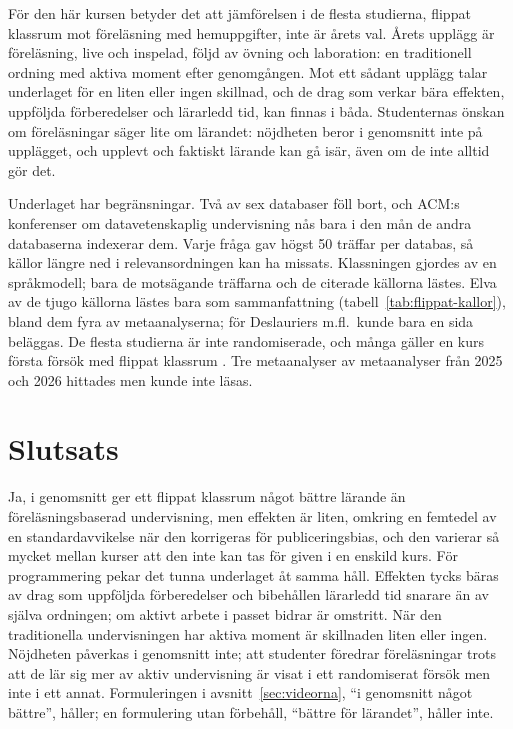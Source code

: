 För den här kursen betyder det att jämförelsen i de flesta studierna,
flippat klassrum mot föreläsning med hemuppgifter, inte är årets val.
Årets upplägg är föreläsning, live och inspelad, följd av övning och
laboration: en traditionell ordning med aktiva moment efter genomgången.
Mot ett sådant upplägg talar underlaget för en liten eller ingen skillnad,
och de drag som verkar bära effekten, uppföljda förberedelser och
lärarledd tid, kan finnas i båda. Studenternas önskan om
föreläsningar säger lite om lärandet: nöjdheten beror i genomsnitt inte på
upplägget, och upplevt och faktiskt lärande kan gå isär, även om de inte
alltid gör det.

Underlaget har begränsningar. Två av sex databaser föll bort, och ACM:s
konferenser om datavetenskaplig undervisning nås bara i den mån de andra
databaserna indexerar dem. Varje fråga gav högst 50 träffar per databas,
så källor längre ned i relevansordningen kan ha missats. Klassningen
gjordes av en språkmodell; bara de motsägande träffarna och de citerade
källorna lästes. Elva av de tjugo källorna lästes bara som sammanfattning
(tabell~\ref{tab:flippat-kallor}), bland dem fyra av metaanalyserna; för
Deslauriers m.fl.\ kunde bara en sida beläggas. De flesta studierna är
inte randomiserade, och många gäller en kurs första försök med flippat
klassrum \parencite[12]{LagSaele2019}. Tre metaanalyser av metaanalyser
från 2025 och 2026 hittades men kunde inte läsas.

\section{Slutsats}

Ja, i genomsnitt ger ett flippat klassrum något bättre lärande än
föreläsningsbaserad undervisning, men effekten är liten, omkring en
femtedel av en standardavvikelse när den korrigeras för publiceringsbias,
och den varierar så mycket mellan kurser att den inte kan tas för given i
en enskild kurs. För programmering pekar det tunna underlaget åt samma
håll. Effekten tycks bäras av drag som uppföljda förberedelser och bibehållen
lärarledd tid snarare än av själva ordningen; om aktivt arbete i passet
bidrar är omstritt. När den traditionella undervisningen har aktiva moment
är skillnaden liten eller ingen. Nöjdheten påverkas i genomsnitt inte; att studenter föredrar
föreläsningar trots att de lär sig mer av aktiv undervisning är visat i
ett randomiserat försök men inte i ett annat. Formuleringen i
avsnitt~\ref{sec:videorna}, \enquote{i genomsnitt något bättre}, håller;
en formulering utan förbehåll, \enquote{bättre för lärandet}, håller inte.

